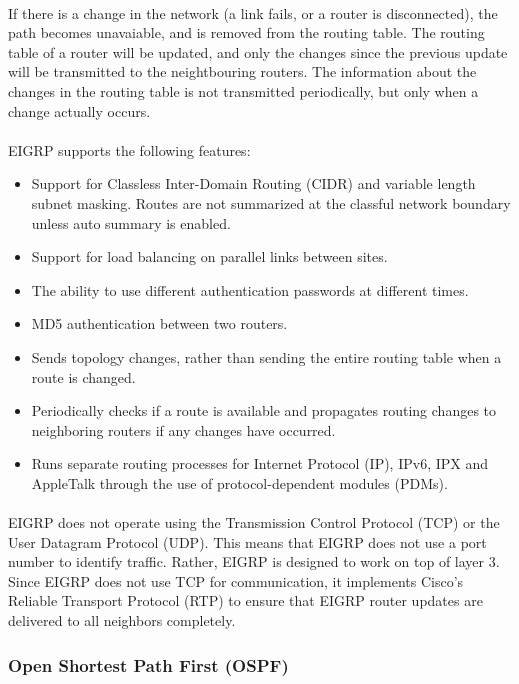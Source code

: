 \paragraph{}If there is a change in the network (a link fails, or a router is disconnected), the path becomes unavaiable, and is removed from the routing table. The routing table of a router will be updated, and only the changes since the previous update will be transmitted to the neightbouring routers. The information about the changes in the routing table is not transmitted periodically, but only when a change actually occurs.
\paragraph{}EIGRP supports the following features:
\begin{itemize}
\item Support for Classless Inter-Domain Routing (CIDR) and variable length subnet masking. Routes are not summarized at the classful network boundary unless auto summary is enabled.
\item Support for load balancing on parallel links between sites.
\item The ability to use different authentication passwords at different times.
\item MD5 authentication between two routers.
\item Sends topology changes, rather than sending the entire routing table when a route is changed.
\item Periodically checks if a route is available and propagates routing changes to neighboring routers if any changes have occurred.
\item Runs separate routing processes for Internet Protocol (IP), IPv6, IPX and AppleTalk through the use of protocol-dependent modules (PDMs).
\end{itemize}
\paragraph{}EIGRP does not operate using the Transmission Control Protocol (TCP) or the User Datagram Protocol (UDP). This means that EIGRP does not use a port number to identify traffic. Rather, EIGRP is designed to work on top of layer 3. Since EIGRP does not use TCP for communication, it implements Cisco's Reliable Transport Protocol (RTP) to ensure that EIGRP router updates are delivered to all neighbors completely.

\subsubsection*{Open Shortest Path First (OSPF)\cite{OSPFv2}\cite{OSPFIPv6}}
